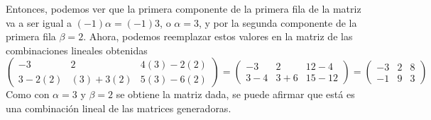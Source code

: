     Entonces, podemos ver que la primera componente de la primera fila de la matriz va a ser igual a 
    \((-1) \alpha = (-1) 3\), o \(\alpha = 3\), y por la segunda componente de la primera fila \(\beta = 2\).
    Ahora, podemos reemplazar estos valores en la matriz de las combinaciones lineales obtenidas
    \[
        \begin{pmatrix}
            -3 & 2 & 4(3) - 2(2) \\
            3 -2(2) & (3) + 3(2) & 5(3) - 6(2)
        \end{pmatrix}
        =
        \begin{pmatrix}
            -3 & 2 & 12 - 4 \\
            3 -4 & 3 + 6 & 15 - 12
        \end{pmatrix}
        =
        \begin{pmatrix}
            -3 & 2 & 8 \\
            -1 & 9 & 3
        \end{pmatrix}
    \]
    Como con \(\alpha = 3\) y \(\beta = 2\) se obtiene la matriz dada, se puede afirmar que está es una combinación lineal de las matrices generadoras.
